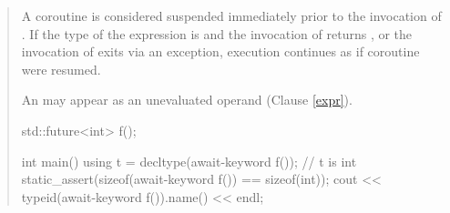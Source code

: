 \begin{quote}

\pnum
A coroutine is considered suspended immediately prior to  the invocation of . If the type of the expression  is  and the invocation of  returns , or the invocation of  exits via an exception, execution continues as if coroutine were resumed. 


\pnum
\enternote
An  may appear as an unevaluated operand (Clause \ref{expr}). 
\enterexample
\begin{codeblock}	
  std::future<int> f();
  
  int main() {
    using t = decltype(await-keyword f()); // t is int
    static_assert(sizeof(await-keyword f()) == sizeof(int));
    cout << typeid(await-keyword f()).name() << endl;
  }
\end{codeblock}
\exitexample%
\exitnote

\end{quote}
%
%
%
%
%
%
%
%
